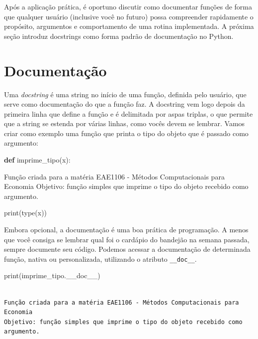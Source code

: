 \documentclass[
  brazilian,
  letterpaper,
  DIV=11,
  numbers=noendperiod]{scrreprt}
\newenvironment{Shaded}{\begin{snugshade}}{\end{snugshade}}
\newcommand{\BuiltInTok}[1]{\textcolor[rgb]{0.00,0.23,0.31}{#1}}
\newcommand{\CommentTok}[1]{\textcolor[rgb]{0.37,0.37,0.37}{#1}}
\newcommand{\KeywordTok}[1]{\textcolor[rgb]{0.00,0.23,0.31}{\textbf{#1}}}
\newcommand{\NormalTok}[1]{\textcolor[rgb]{0.00,0.23,0.31}{#1}}
\begin{document}
Após a aplicação prática, é oportuno discutir como documentar funções de
forma que qualquer usuário (inclusive você no futuro) possa compreender
rapidamente o propósito, argumentos e comportamento de uma rotina
implementada. A próxima seção introduz docstrings como forma padrão de
documentação no Python.

\section{Documentação}\label{documentauxe7uxe3o}

Uma \emph{docstring} é uma string no início de uma função, definida pelo
usuário, que serve como documentação do que a função faz. A docstring
vem logo depois da primeira linha que define a função e é delimitada por
aspas triplas, o que permite que a string se estenda por várias linhas,
como vocês devem se lembrar. Vamos criar como exemplo uma função que
printa o tipo do objeto que é passado como argumento:

\begin{Shaded}
\begin{Highlighting}[]
\KeywordTok{def}\NormalTok{ imprime\_tipo(x):}
    
    \CommentTok{\textquotesingle{}\textquotesingle{}\textquotesingle{}}
\CommentTok{    Função criada para a matéria EAE1106 {-} Métodos Computacionais para Economia}
\CommentTok{    Objetivo: função simples que imprime o tipo do objeto recebido como argumento.}
\CommentTok{    \textquotesingle{}\textquotesingle{}\textquotesingle{}}
    
    \BuiltInTok{print}\NormalTok{(}\BuiltInTok{type}\NormalTok{(x))}
\end{Highlighting}
\end{Shaded}

Embora opcional, a documentação é uma boa prática de programação. A
menos que você consiga se lembrar qual foi o cardápio do bandejão na
semana passada, sempre documente seu código. Podemos acessar a
documentação de determinada função, nativa ou personalizada, utilizando
o atributo \texttt{\_\_doc\_\_}.

\begin{Shaded}
\begin{Highlighting}[]
\BuiltInTok{print}\NormalTok{(imprime\_tipo.\_\_doc\_\_)}
\end{Highlighting}
\end{Shaded}

\begin{verbatim}

Função criada para a matéria EAE1106 - Métodos Computacionais para Economia
Objetivo: função simples que imprime o tipo do objeto recebido como argumento.
\end{verbatim}
\end{document}
